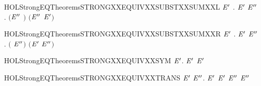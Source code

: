 \newcommand{\HOLStrongEQTheoremsSTRONGXXEQUIVXXSUBSTXXRESTR}{\UseVerbatim{HOLStrongEQTheoremsSTRONGXXEQUIVXXSUBSTXXRESTR}}
\begin{SaveVerbatim}{HOLStrongEQTheoremsSTRONGXXEQUIVXXSUBSTXXSUMXXL}
\HOLTokenTurnstile{} \HOLSymConst{\HOLTokenForall{}}\ensuremath{\HOLBoundVar{E}\sp{\prime}} .
         \ensuremath{\HOLBoundVar{E}\sp{\prime}} \HOLSymConst{\HOLTokenImp{}}
       \HOLSymConst{\HOLTokenForall{}}\ensuremath{\HOLBoundVar{E}\sp{\prime\prime}}.  \ensuremath{(}\ensuremath{\HOLBoundVar{E}\sp{\prime\prime}} \HOLSymConst{\ensuremath{+}} \ensuremath{)} \ensuremath{(}\ensuremath{\HOLBoundVar{E}\sp{\prime\prime}} \HOLSymConst{\ensuremath{+}} \ensuremath{\HOLBoundVar{E}\sp{\prime}}\ensuremath{)}
\end{SaveVerbatim}
\newcommand{\HOLStrongEQTheoremsSTRONGXXEQUIVXXSUBSTXXSUMXXL}{\UseVerbatim{HOLStrongEQTheoremsSTRONGXXEQUIVXXSUBSTXXSUMXXL}}
\begin{SaveVerbatim}{HOLStrongEQTheoremsSTRONGXXEQUIVXXSUBSTXXSUMXXR}
\HOLTokenTurnstile{} \HOLSymConst{\HOLTokenForall{}}\ensuremath{\HOLBoundVar{E}\sp{\prime}} .
         \ensuremath{\HOLBoundVar{E}\sp{\prime}} \HOLSymConst{\HOLTokenImp{}}
       \HOLSymConst{\HOLTokenForall{}}\ensuremath{\HOLBoundVar{E}\sp{\prime\prime}}.  \ensuremath{(} \HOLSymConst{\ensuremath{+}} \ensuremath{\HOLBoundVar{E}\sp{\prime\prime}}\ensuremath{)} \ensuremath{(}\ensuremath{\HOLBoundVar{E}\sp{\prime}} \HOLSymConst{\ensuremath{+}} \ensuremath{\HOLBoundVar{E}\sp{\prime\prime}}\ensuremath{)}
\end{SaveVerbatim}
\newcommand{\HOLStrongEQTheoremsSTRONGXXEQUIVXXSUBSTXXSUMXXR}{\UseVerbatim{HOLStrongEQTheoremsSTRONGXXEQUIVXXSUBSTXXSUMXXR}}
\begin{SaveVerbatim}{HOLStrongEQTheoremsSTRONGXXEQUIVXXSYM}
\HOLTokenTurnstile{} \HOLSymConst{\HOLTokenForall{}} \ensuremath{\HOLBoundVar{E}\sp{\prime}}.   \ensuremath{\HOLBoundVar{E}\sp{\prime}} \HOLSymConst{\HOLTokenImp{}}  \ensuremath{\HOLBoundVar{E}\sp{\prime}} 
\end{SaveVerbatim}
\newcommand{\HOLStrongEQTheoremsSTRONGXXEQUIVXXSYM}{\UseVerbatim{HOLStrongEQTheoremsSTRONGXXEQUIVXXSYM}}
\begin{SaveVerbatim}{HOLStrongEQTheoremsSTRONGXXEQUIVXXTRANS}
\HOLTokenTurnstile{} \HOLSymConst{\HOLTokenForall{}} \ensuremath{\HOLBoundVar{E}\sp{\prime}} \ensuremath{\HOLBoundVar{E}\sp{\prime\prime}}.
         \ensuremath{\HOLBoundVar{E}\sp{\prime}} \HOLSymConst{\HOLTokenConj{}}  \ensuremath{\HOLBoundVar{E}\sp{\prime}} \ensuremath{\HOLBoundVar{E}\sp{\prime\prime}} \HOLSymConst{\HOLTokenImp{}}
         \ensuremath{\HOLBoundVar{E}\sp{\prime\prime}}
\end{SaveVerbatim}
